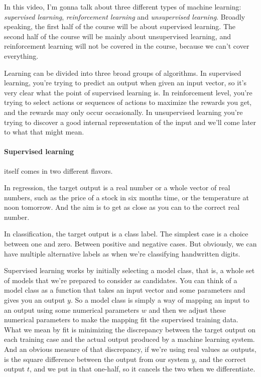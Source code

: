 \begin{multicols}{2}
\begin{footnotesize}
In this video, I'm gonna talk about three different types of machine learning: \emph{supervised learning}, \emph{reinforcement learning} and \emph{unsupervised learning}. Broadly speaking, the first half of the course will be about supervised learning. The second half of the course will be mainly about unsupervised learning, and reinforcement learning will not be covered in the course, because we can't cover everything.

Learning can be divided into three broad groups of algorithms.
In supervised learning, you're trying to predict an output when given an input vector, so it's very clear what the point of supervised learning is. In reinforcement level, you're trying to select actions or sequences of actions to maximize the rewards you get, and the rewards may only occur occasionally. In unsupervised learning you're trying to discover a good internal representation of the input and we'll come later to what that might mean.

\paragraph{Supervised learning} itself comes in two different flavors.
\begin{nitemize}
\item In regression, the target output is a real number or a whole vector of real numbers, such as the price of a stock in six months time, or the temperature at noon tomorrow. And the aim is to get as close as you can to the correct real number.
\item In classification, the target output is a class label. The simplest case is a choice between one and zero. Between positive and negative cases. But obviously, we can have multiple alternative labels as when we're classifying handwritten digits.
\end{nitemize}

Supervised learning works by initially selecting a model class, that is, a whole set of models that we're prepared to consider as candidates. You can think of a model class as a function that takes an input vector and some parameters and gives you an output $y$. So a model class is simply a way of mapping an input to an output using some numerical parameters $w$ and then we adjust these numerical parameters to make the mapping fit the supervised training data. What we mean by fit is minimizing the discrepancy between the target output on each training case and the actual output produced by a machine learning system. And an obvious measure of that discrepancy, if we're using real values as outputs, is the square difference between the output from our system $y$, and the correct output $t$, and we put in that one-half, so it cancels the two when we differentiate.


\end{footnotesize}
\end{multicols}
